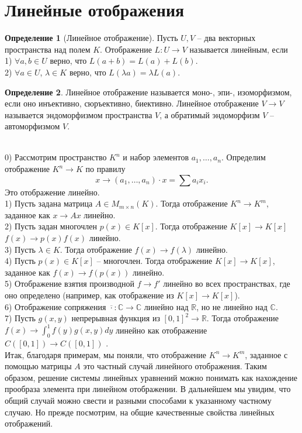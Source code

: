 \documentclass[10pt,a4paper,oneside]{book}
\theoremstyle{definition}
\newtheorem*{defn}{Определение}
\newcommand{\mb}[1]{\mathbb{#1}}
\newcommand{\ovl}{\overline}
\def\exm{\noindent {\bf Примеры:}}
\def\dfn{\begin{defn}}
\def\edfn{\end{defn}}
\begin{document}
\section{Линейные отображения}

\dfn[Линейное отображение] Пусть $U,V$ -- два векторных пространства над полем $K$. Отображение $L\colon U \to V$ называется линейным, если\\
1) $\forall a,b \in U$ верно, что $L(a+b)=L(a)+L(b)$.\\
2) $\forall a \in U$, $\lambda \in K$ верно, что $L(\lambda a)=\lambda L(a)$.
\edfn

\dfn Линейное отображение называется моно-, эпи-, изоморфизмом, если оно инъективно, сюръективно, биективно. Линейное отображение $V \to V$ называется эндоморфизмом пространства $V$, а обратимый эндоморфизм $V$ -- автоморфизмом $V$.
\edfn

\exm\\
0) Рассмотрим пространство $K^n$ и набор элементов $a_1,\dots,a_n$. Определим отображение $K^n \to K$ по правилу $$x \to (a_1,\dots, a_n) \cdot x= \sum a_ix_i.$$
Это отображение линейно.\\
1) Пусть задана матрица $A \in M_{m\times n}(K)$. Тогда отображение $K^n \to K^m$, заданное как $x \to Ax$ линейно.\\
2) Пусть задан многочлен $p(x) \in K[x]$. Тогда отображение $K[x] \to K[x]$ $f(x)\to p(x)f(x)$ линейно.\\
3) Пусть $\lambda \in K$. Тогда отображение $f(x) \to f(\lambda)$ линейно.\\
4) Пусть $p(x) \in K[x]$ -- многочлен. Тогда отображение $K[x] \to K[x]$, заданное как  $f(x)\to f(p(x))$ линейно.\\
5) Отображение взятия производной $f \to f'$ линейно во всех пространствах, где оно определено (например, как отображение из $K[x] \to K[x]$).\\
6) Отображение сопряжения $\ovl{\cdot} \colon \mb C \to \mb C$ линейно над $\mb R$, но не линейно над $\mb C$.\\
7) Пусть $g(x,y)$ непрерывная функция из $[0,1]^2 \to \mb R$. Тогда отображение $f(x) \to \int_{0}^1 f(y)g(x,y)dy$ линейно  как отображение $C([0,1])\to C([0,1])$ .\\




Итак, благодаря примерам, мы поняли, что отображение $K^n \to K^m$, заданное с помощью матрицы $A$ это частный случай линейного отображения. Таким образом, решение системы линейных уравнений можно понимать как нахождение прообраза элемента при линейном отображении. В дальнейшем мы увидим, что общий случай можно свести  и разными способами к указанному частному случаю. Но прежде посмотрим, на общие качественные свойства линейных отображений.
\end{document}
